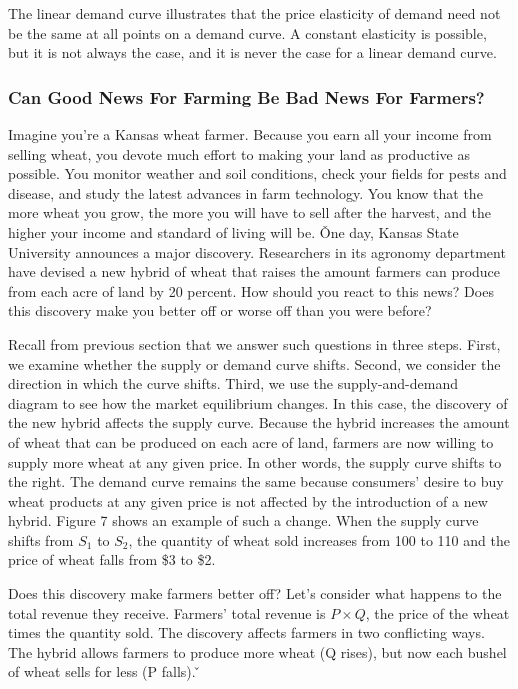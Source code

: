 The linear demand curve illustrates that the price elasticity of demand need not be the same at all points on a
demand curve. A constant elasticity is possible, but it is not always the case, and it is never the case for a linear
demand curve.



\subsubsection*{Can Good News For Farming Be Bad News For Farmers?}

Imagine you're a Kansas wheat farmer. Because you earn all your income from selling wheat, you devote much effort to
making your land as productive as possible. You monitor weather and soil conditions, check your fields for pests and
disease, and study the latest advances in farm technology. You know that the more wheat you grow, the more you will
have to sell after the harvest, and the higher your income and standard of living will be. \v

One day, Kansas State University announces a major discovery. Researchers in its agronomy department have devised a
new hybrid of wheat that raises the amount farmers can produce from each acre of land by 20 percent. How should you
react to this news? Does this discovery make you better off or worse off than you were before?


Recall from previous section that we answer such questions in three steps. First, we examine whether the supply or
demand curve shifts. Second, we consider the direction in which the curve shifts. Third, we use the supply-and-demand
diagram to see how the market equilibrium changes. In this case, the discovery of the new hybrid affects the supply
curve. Because the hybrid increases the amount of wheat that can be produced on each acre of land, farmers are now
willing to supply more wheat at any given price. In other words, the supply curve shifts to the right. The demand
curve remains the same because consumers' desire to buy wheat products at any given price is not affected by the
introduction of a new hybrid. Figure 7 shows an example of such a change. When the supply curve shifts from $S_1$ to
$S_2$, the quantity of wheat sold increases from 100 to 110 and the price of wheat falls from \$3 to \$2.

Does this discovery make farmers better off? Let's consider what happens to the total revenue they receive. Farmers'
total revenue is $P \times Q$, the price of the wheat times the quantity sold. The discovery affects farmers in two
conflicting ways. The hybrid allows farmers to produce more wheat (Q rises), but now each bushel of wheat sells for
less (P falls). \v

